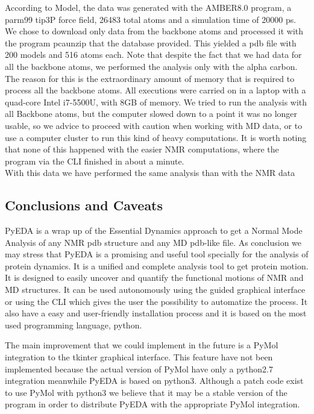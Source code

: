 \documentclass[12pt]{article}
\begin{document}
According to Model, the data was generated with the AMBER8.0 program, a 	parm99 tip3P force field, 26483 total atoms and a simulation time of 20000 ps. We chose to download only data from the backbone atoms and processed it with the program pcaunzip that the database provided. This yielded a pdb file with 200 models and 516 atoms each. Note that despite the fact that we had data for all the backbone atoms, we performed the analysis only with the alpha carbon. The reason for this is the extraordinary amount of memory that is required to process all the backbone atoms. All executions were carried on in a laptop with a quad-core Intel i7-5500U, with 8GB of memory. We tried to run the analysis with all Backbone atoms, but the computer slowed down to a point it was no longer usable, so we advice to proceed with caution when working with MD data, or to use a computer cluster to run this kind of heavy computations. It is worth noting that none of this happened with the easier NMR computations, where the program via the CLI finished in about a minute.\\

With this data we have performed the same analysis than with the NMR data

\subsection{Conclusions and Caveats}
PyEDA is a wrap up of the Essential Dynamics approach to get a Normal Mode Analysis of any NMR pdb structure and any MD pdb-like file. As conclusion we may stress that PyEDA is a promising and useful tool specially for the analysis of protein dynamics.  It is a unified and complete analysis tool to get protein motion. It is designed to easily uncover and quantify the functional motions of NMR and MD structures. It can be used autonomously using the guided graphical interface or using the CLI which gives the user the possibility to automatize the process. It also have a easy and user-friendly installation process and it is based on the most used programming language, python. 

The main improvement that we could implement in the future is a PyMol integration to the tkinter graphical interface. This feature have not been implemented because the actual version of PyMol have only a python2.7 integration meanwhile PyEDA is based on python3. Although a patch code exist to use PyMol with python3 we believe that it may be a stable version of the program in order to distribute PyEDA with the appropriate PyMol integration. 
\end{document}
